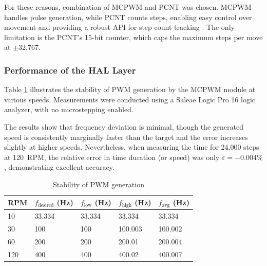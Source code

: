 For these reasons, combination of MCPWM and PCNT was chosen.
MCPWM handles pulse generation, while PCNT counts steps, enabling easy control over movement and providing a robust API for step count tracking \cite{espPCNT}.
The only limitation is the PCNT’s 15-bit counter, which caps the maximum steps per move at $\pm$32,767.


\subsubsection{Performance of the HAL Layer}

Table \ref{tab:performancepwm} illustrates the stability of PWM generation by the MCPWM module at various speeds.
Measurements were conducted using a Saleae Logic Pro 16 logic analyzer, with no microstepping enabled.

The results show that frequency deviation is minimal, though the generated speed is consistently marginally faster than the target and the error increases slightly at higher speeds.
Nevertheless, when measuring the time for 24,000 steps at 120~RPM, the relative error in time duration (or speed) was only $\varepsilon = -0.004\%$, demonstrating excellent accuracy.


\begin{table}[h!]
  \centering
  \caption[Stability of PWM generation]{Stability of PWM generation}
  \begin{tabular}{| m{2cm} || m{2.5cm} | m{2.5cm} | m{2.5cm} | m{2.5cm} |}
    \hline
    RPM & $f_{\mathrm{desired}}$ (Hz) & $f_{\mathrm{low}}$ (Hz) & $f_{\mathrm{high}}$ (Hz) & $f_\mathrm{avg}$ (Hz) \\
    \hline
    10  & 33.334                      & 33.334                  & 33.334                   & 33.334                \\
    30  & 100                         & 100                     & 100.003                  & 100.002               \\
    60  & 200                         & 200                     & 200.01                   & 200.004               \\
    120 & 400                         & 400                     & 400.02                   & 400.007               \\
    \hline
  \end{tabular}
  \label{tab:performancepwm}
\end{table}

